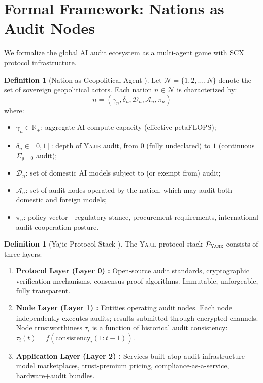 \documentclass[11pt,a4paper]{article}
\theoremstyle{definition}
\newtheorem{definition}[theorem]{Definition}
\theoremstyle{remark}
\newcommand{\SCX}{\textsc{SCX}}
\newcommand{\Yajie}{\textsc{Yajie}}
\newcommand{\R}{\mathbb{R}}
\newcommand{\cA}{\mathcal{A}}
\newcommand{\cD}{\mathcal{D}}
\newcommand{\cP}{\mathcal{P}}
\newcommand{\auditDepth}{\delta}
\newcommand{\gpuScale}{\gamma}
\newcommand{\sumGZero}{\Sigma_{g=0}}
\newcommand{\nationSet}{\mathcal{N}}
\begin{document}
\section{Formal Framework: Nations as Audit Nodes}
\label{sec:framework}
We formalize the global AI audit ecosystem as a multi-agent game with \SCX{} protocol infrastructure.
\begin{definition}[Nation as Geopolitical Agent ]
Let $\nationSet = \{1, 2, \ldots, N\}$ denote the set of sovereign geopolitical actors. Each nation $n \in \nationSet$ is characterized by:
\begin{equation}
    n = (\gpuScale_n, \auditDepth_n, \cD_n, \cA_n, \pi_n)
    \label{eq:nation_tuple}
\end{equation}
where:
\begin{itemize}
    \item $\gpuScale_n \in \R_{+}$: aggregate AI compute capacity (effective petaFLOPS);
    \item $\auditDepth_n \in [0, 1]$: depth of \Yajie{} audit, from $0$ (fully undeclared) to $1$ (continuous $\sumGZero$ audit);
    \item $\cD_n$: set of domestic AI models subject to (or exempt from) audit;
    \item $\cA_n$: set of audit nodes operated by the nation, which may audit both domestic and foreign models;
    \item $\pi_n$: policy vector---regulatory stance, procurement requirements, international audit cooperation posture.
\end{itemize}
\end{definition}
\begin{definition}[Yajie Protocol Stack ]
\label{def:protocol_stack}
The \Yajie{} protocol stack $\cP_{\Yajie}$ consists of three layers:
\begin{enumerate}[label=\textbf{L\arabic*:}, leftmargin=*]
    \item \textbf{Protocol Layer (Layer 0) :} Open-source audit standards, cryptographic verification mechanisms, consensus proof algorithms. Immutable, unforgeable, fully transparent.
    \item \textbf{Node Layer (Layer 1) :} Entities operating audit nodes. Each node independently executes audits; results submitted through encrypted channels. Node trustworthiness $\tau_i$ is a function of historical audit consistency: $\tau_i(t) = f(\text{consistency}_i(1:t-1))$.
    \item \textbf{Application Layer (Layer 2) :} Services built atop audit infrastructure---model marketplaces, trust-premium pricing, compliance-as-a-service, hardware+audit bundles.
\end{enumerate}
\end{definition}
\end{document}
